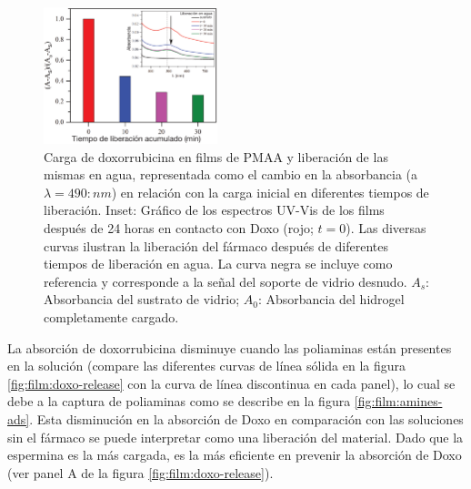 \begin{figure}[!htb]
	\centering
	\includegraphics[width=0.45\textwidth]{Figures/graph-film/Release_water_2.pdf}
	\caption{Carga de doxorrubicina en films de PMAA y liberaci\'on de las mismas en agua, representada como el cambio en la absorbancia (a $\lambda=490:nm$) en relaci\'on con la carga inicial en diferentes tiempos de liberaci\'on.
		Inset: Gr\'afico de los espectros UV-Vis de los films despu\'es de 24 horas en contacto con Doxo (rojo; $t=0$).
		Las diversas curvas ilustran la liberaci\'on del f\'armaco despu\'es de diferentes tiempos de liberaci\'on en agua.
		La curva negra se incluye como referencia y corresponde a la se\~nal del soporte de vidrio desnudo. $A_s$: Absorbancia del sustrato de vidrio; $A_0$: Absorbancia del hidrogel completamente cargado.}
	\label{fig:film:exp_doxo-water}
\end{figure}




La absorci\'on de doxorrubicina disminuye cuando las poliaminas est\'an presentes en la soluci\'on (compare las diferentes curvas de l\'inea s\'olida en la figura \ref{fig:film:doxo-release} con la curva de l\'inea discontinua en cada panel), lo cual se debe a la captura de poliaminas como se describe en la figura \ref{fig:film:amines-ads}. Esta disminuci\'on en la absorci\'on de Doxo en comparaci\'on con las soluciones sin el f\'armaco se puede interpretar como una liberaci\'on del material. Dado que la espermina es la m\'as cargada, es la m\'as eficiente en prevenir la absorci\'on de Doxo (ver panel A de la figura \ref{fig:film:doxo-release}).



